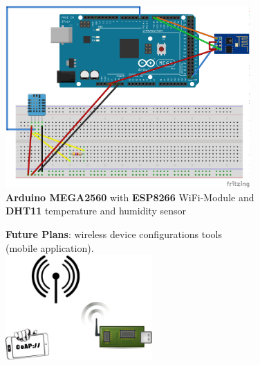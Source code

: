 \documentclass{beamer}
\begin{document}
    \begin{frame}
        \begin{center}
        \includegraphics[width=0.7\textwidth,keepaspectratio]{maket}\\
        \textbf{Arduino MEGA2560} with
        \textbf{ESP8266} WiFi-Module and \\
        \textbf{DHT11} temperature and humidity sensor
        \end{center}
        
    \end{frame}

    \begin{frame}
        \center\textbf{Future Plans}: wireless device configurations tools\\(mobile application).\\
        \center\includegraphics[height=4cm,keepaspectratio]{configuratorapp}\\
    \end{frame}
\end{document}
